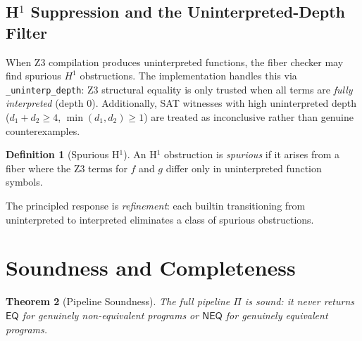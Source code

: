\documentclass[11pt,a4paper]{report}
\theoremstyle{definition}
\newtheorem{definition}{Definition}[chapter]
\theoremstyle{plain}
\newtheorem{theorem}[definition]{Theorem}
\begin{document}
\subsection{H$^1$ Suppression and the Uninterpreted-Depth Filter}

When Z3 compilation produces uninterpreted functions, the fiber
checker may find spurious $H^1$ obstructions.  The implementation
handles this via \texttt{\_uninterp\_depth}: Z3 structural
equality is only trusted when all terms are \emph{fully interpreted}
(depth 0).  Additionally, SAT witnesses with high uninterpreted
depth ($d_1 + d_2 \geq 4$, $\min(d_1, d_2) \geq 1$) are treated
as inconclusive rather than genuine counterexamples.

\begin{definition}[Spurious H$^1$]
An H$^1$ obstruction is \emph{spurious} if it arises from a fiber
where the Z3 terms for $f$ and $g$ differ only in uninterpreted
function symbols.
\end{definition}

The principled response is \emph{refinement}: each builtin
transitioning from uninterpreted to interpreted eliminates a
class of spurious obstructions.


\section{Soundness and Completeness}
\label{sec:fallback-soundness}

\begin{theorem}[Pipeline Soundness]
\label{thm:pipeline-soundness}
The full pipeline $\Pi$ is \emph{sound}: it never returns
$\mathsf{EQ}$ for genuinely non-equivalent programs or
$\mathsf{NEQ}$ for genuinely equivalent programs.
\end{theorem}
\end{document}
